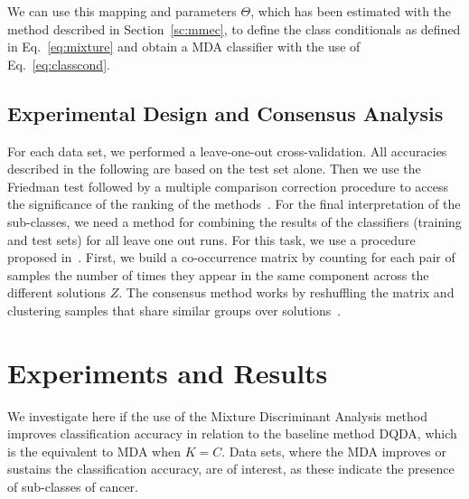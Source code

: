\documentclass[runningheads,a4paper]{llncs}
\begin{document}
We can use this mapping and parameters $\Theta$, which has been
estimated with the method described in Section~\ref{sc:mmec}, to define
the class conditionals as defined in Eq.~\ref{eq:mixture} and obtain a
MDA classifier with the use of Eq.~\ref{eq:classcond}.


\subsection{Experimental Design and Consensus Analysis}

For each data set, we performed a leave-one-out cross-validation. All
accuracies described in the following are based on the test set alone.
Then we use the Friedman test followed by a multiple comparison
correction procedure to access the significance of the ranking of the
methods~\cite{Dem2006}. For the final interpretation of the
sub-classes, we need a method for combining the results of the
classifiers (training and test sets) for all leave one out runs.  For
this task, we use a procedure proposed in~\cite{Brunet2004,Monti2003}.  First, we
build a co-occurrence matrix by counting for each pair of samples the
number of times they appear in the same component across the different
solutions $Z$. The consensus method works by reshuffling the matrix
and clustering samples that share similar groups over
solutions~\cite{Monti2003}.

\section{Experiments and Results \label{sec:expres}}

We investigate here if the use of the Mixture Discriminant Analysis
method improves classification accuracy in relation to the baseline
method DQDA, which is the equivalent to MDA when $K=C$. Data sets,
where the MDA improves or sustains the classification accuracy, are of
interest, as these indicate the presence of sub-classes of cancer.
\end{document}
